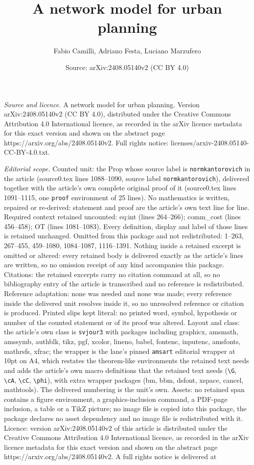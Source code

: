 \documentclass[10pt,a4paper]{amsart}
\title[A network model for urban planning]{A network model for urban planning}
\author{Fabio Camilli, Adriano Festa, Luciano Marzufero}
\date{Source: arXiv:2408.05140v2 (CC BY 4.0)}
\begin{document}
\maketitle

\noindent\emph{Source and licence.} A network model for urban planning. Version arXiv:2408.05140v2 (CC BY 4.0), distributed under the Creative Commons Attribution 4.0 International licence, as recorded in the arXiv licence metadata for this exact version and shown on the abstract page https://arxiv.org/abs/2408.05140v2. Full rights notice: licenses/arxiv-2408.05140-CC-BY-4.0.txt.\par\smallskip

\noindent\textit{Editorial scope.} Counted unit: the Prop whose source label is \texttt{normkantorovich} in the article (source0.tex lines 1088--1090, source label \texttt{normkantorovich}), delivered together with the article's own complete original proof of it (source0.tex lines 1091--1115, one \texttt{proof} environment of 25 lines). No mathematics is written, repaired or re-derived: statement and proof are the article's own text line for line. Required context retained uncounted: eq:int (lines 264--266); comm\_cost (lines 456--458); OT (lines 1081--1083). Every definition, display and label of those lines is retained unchanged. Omitted from this package and not redistributed: 1--263, 267--455, 459--1080, 1084--1087, 1116--1391. Nothing inside a retained excerpt is omitted or altered: every retained body is delivered exactly as the article's lines are written, so no omission receipt of any kind accompanies this package. Citations: the retained excerpts carry no citation command at all, so no bibliography entry of the article is transcribed and no reference is redistributed. Reference adaptation: none was needed and none was made; every reference inside the delivered unit resolves inside it, so no unresolved reference or citation is produced. Printed slips kept literal: no printed word, symbol, hypothesis or number of the counted statement or of its proof was altered. Layout and class: the article's own class is \texttt{svjour3} with packages including graphicx, amsmath, amssymb, authblk, tikz, pgf, xcolor, lineno, babel, fontenc, inputenc, amsfonts, mathrsfs, xfrac; the wrapper is the lane's pinned \texttt{amsart} editorial wrapper at 10pt on A4, which restates the theorem-like environments the retained text needs and adds the article's own macro definitions that the retained text needs (\texttt{\textbackslash G}, \texttt{\textbackslash cA}, \texttt{\textbackslash cC}, \texttt{\textbackslash phi}), with extra wrapper packages (bm, bbm, dsfont, xspace, cancel, mathtools). The delivered numbering is the unit's own. Assets: no retained span contains a figure environment, a graphics-inclusion command, a PDF-page inclusion, a table or a TikZ picture; no image file is copied into this package, the package declares no asset dependency and no image file is redistributed with it. Licence: version arXiv:2408.05140v2 of this article is distributed under the Creative Commons Attribution 4.0 International licence, as recorded in the arXiv licence metadata for this exact version and shown on the abstract page https://arxiv.org/abs/2408.05140v2. A full rights notice is delivered at 
\end{document}
